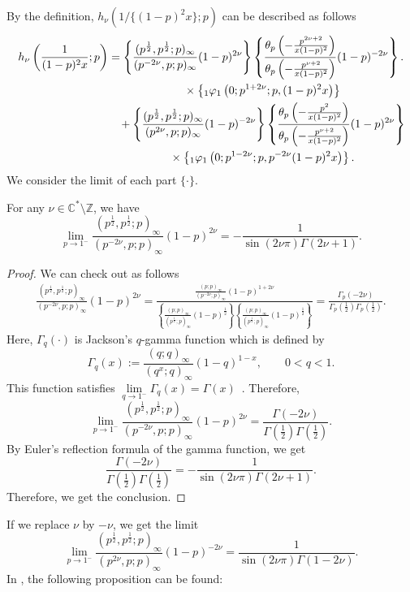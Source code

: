 \documentclass[pdftex]{sigma}
\begin{document}
By the def\/inition, $h_\nu \left(1/\{(1-p)^2x\};p\right)$ can be described as follows
\begin{gather}
 h_\nu\left(\frac{1}{(1-p)^2x};p\right)
 =\left\{\frac{(p^{\frac{1}{2}},p^{\frac{1}{2}};p)_\infty}{(p^{-2\nu},p;p)_\infty}(1-p)^{2\nu}\right\}
\left\{\frac{\theta_p\left(-\frac{p^{2\nu +2}}{x(1-p)^2}\right)}{\theta_p\left(-\frac{p^{\nu +2}}{x(1-p)^2}\right)}(1-p)^{-2\nu}\right\} \notag.\\
 \hphantom{h_\nu\left(\frac{1}{(1-p)^2x};p\right) =}{}
  \times\left\{{}_1\varphi_1\left(0;p^{1+2\nu};p,(1-p)^2x\right)\right\}\notag\\
\hphantom{h_\nu\left(\frac{1}{(1-p)^2x};p\right) =}{}  +
\left\{\frac{(p^{\frac{1}{2}},p^{\frac{1}{2}};p)_\infty}{(p^{2\nu},p;p)_\infty}(1-p)^{-2\nu}\right\}
\left\{\frac{\theta_p\left(-\frac{p^2}{x(1-p)^2}\right)}{\theta_p\left(-\frac{p^{\nu +2}}{x(1-p)^2}\right)}(1-p)^{2\nu}\right\} \notag\\
\hphantom{h_\nu\left(\frac{1}{(1-p)^2x};p\right) =}{} \times
\left\{{}_1\varphi_1\left(0;p^{1-2\nu};p,p^{-2\nu}(1-p)^2x\right)\right\}.\label{limit}
\end{gather}
We consider the limit of each part $\{\cdot \}$.

\begin{lemma}\label{limgam}For any $\nu \in\mathbb{C}^*\setminus \mathbb{Z}$, we have
\[\lim_{p\to 1^-}
\frac{(p^{\frac{1}{2}},p^{\frac{1}{2}};p)_\infty}{(p^{-2\nu},p;p)_\infty}(1-p)^{2\nu}
=-\frac{1}{\sin (2\nu\pi )\Gamma (2\nu +1)}.
\]
\end{lemma}
\begin{proof}We can check out as follows
\begin{gather*}
\frac{(p^{\frac{1}{2}},p^{\frac{1}{2}};p)_\infty}{(p^{-2\nu},p;p)_\infty}(1-p)^{2\nu} =\frac{\frac{(p;p)_\infty}{(p^{-2\nu};p)_\infty}(1-p)^{1+2\nu}}
{\left\{\frac{(p;p)_\infty}{(p^{\frac{1}{2}};p)_\infty}(1-p)^{\frac{1}{2}}\right\}
\left\{\frac{(p;p)_\infty}{(p^{\frac{1}{2}};p)_\infty}(1-p)^{\frac{1}{2}}\right\}
} =\frac{\Gamma_p(-2\nu )}{\Gamma_p\left(\frac{1}{2}\right)\Gamma_p\left(\frac{1}{2}\right)}.
\end{gather*}
Here, $\Gamma_q(\cdot )$ is Jackson's $q$-gamma function which is def\/ined by
\[\Gamma_q(x):=\frac{(q;q)_\infty}{(q^x;q)_\infty}(1-q)^{1-x},\qquad 0<q<1.\]
This function satisf\/ies $\lim\limits_{q\to 1^-}\Gamma_q(x)=\Gamma (x)$~\cite{GR}. Therefore,
\[\lim_{p\to 1^-}
\frac{(p^{\frac{1}{2}},p^{\frac{1}{2}};p)_\infty}{(p^{-2\nu},p;p)_\infty}(1-p)^{2\nu}
=\frac{\Gamma (-2\nu )}{\Gamma \left(\frac{1}{2}\right)\Gamma \left(\frac{1}{2}\right)}.\]
By Euler's ref\/lection formula of the gamma function, we get
\[\frac{\Gamma (-2\nu )}{\Gamma\left(\frac{1}{2}\right)\Gamma\left(\frac{1}{2}\right)}=
-\frac{1}{\sin (2\nu\pi )\Gamma (2\nu +1)}.\]
Therefore, we get the conclusion.
\end{proof}
If we replace $\nu$ by $-\nu$, we get the limit
\[
\lim_{p\to 1^-}
\frac{(p^{\frac{1}{2}},p^{\frac{1}{2}};p)_\infty}{(p^{2\nu},p;p)_\infty}(1-p)^{-2\nu}=\frac{1}{\sin (2\nu\pi )\Gamma (1-2\nu )}.
\]
In \cite{Z1}, the following proposition can be found:
\end{document}

